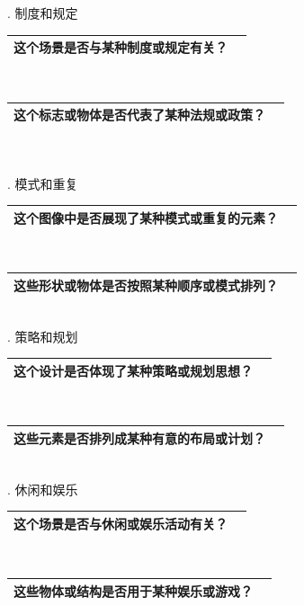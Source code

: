 \documentclass[12pt]{book}
\begin{document}
. 制度和规定

\begin{tabular}{|p{15cm}|p{3cm}|}
	\hline
这个场景是否与某种制度或规定有关？\\
	\hline
\end{tabular}\\


\begin{tabular}{|p{15cm}|p{3cm}|}
	\hline
这个标志或物体是否代表了某种法规或政策？\\
	\hline
\end{tabular}\\\\



. 模式和重复

\begin{tabular}{|p{15cm}|p{3cm}|}
	\hline
这个图像中是否展现了某种模式或重复的元素？\\
	\hline
\end{tabular}\\



\begin{tabular}{|p{15cm}|p{3cm}|}
	\hline
这些形状或物体是否按照某种顺序或模式排列？\\
	\hline
\end{tabular}\\


. 策略和规划

\begin{tabular}{|p{15cm}|p{3cm}|}
	\hline
这个设计是否体现了某种策略或规划思想？\\
	\hline
\end{tabular}\\


\begin{tabular}{|p{15cm}|p{3cm}|}
	\hline
这些元素是否排列成某种有意的布局或计划？\\
	\hline
\end{tabular}\\


. 休闲和娱乐

\begin{tabular}{|p{15cm}|p{3cm}|}
	\hline
这个场景是否与休闲或娱乐活动有关？\\
	\hline
\end{tabular}\\



\begin{tabular}{|p{15cm}|p{3cm}|}
	\hline
这些物体或结构是否用于某种娱乐或游戏？\\
	\hline
\end{tabular}\\
\end{document}
